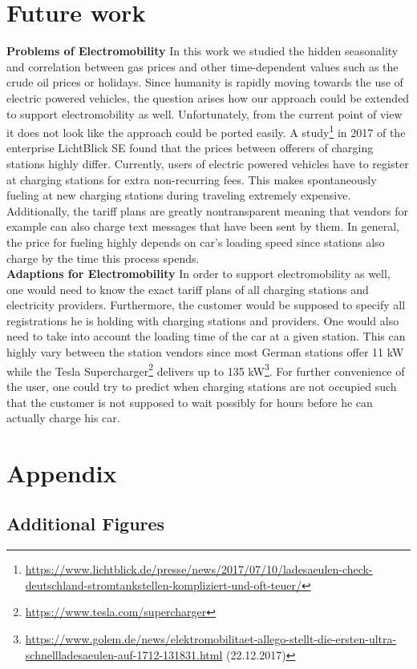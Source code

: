 \documentclass[%
a4paper,
DIV12,
2.5headlines,
bigheadings,
titlepage,
openbib,
]{scrartcl}
\begin{document}
\section{Future work}\label{future-work}
\textbf{Problems of Electromobility}
In this work we studied the hidden seasonality and correlation between gas prices and other time-dependent values such as the crude oil prices or holidays.
Since humanity is rapidly moving towards the use of electric powered vehicles, the question arises how our approach could be extended to support electromobility as well.
Unfortunately, from the current point of view it does not look like the approach could be ported easily.
A study\footnote{\url{https://www.lichtblick.de/presse/news/2017/07/10/ladesaeulen-check-deutschland-stromtankstellen-kompliziert-und-oft-teuer/}} in 2017 of the enterprise LichtBlick SE found that the prices between offerers of charging stations highly differ.
Currently, users of electric powered vehicles have to register at charging stations for extra non-recurring fees.
This makes spontaneously fueling at new charging stations during traveling extremely expensive.
Additionally, the tariff plans are greatly nontransparent meaning that vendors for example can also charge text messages that have been sent by them.
In general, the price for fueling highly depends on car's loading speed since stations also charge by the time this process spends.\\

\textbf{Adaptions for Electromobility}
In order to support electromobility as well, one would need to know the exact tariff plans of all charging stations and electricity providers.
Furthermore, the customer would be supposed to specify all registrations he is holding with charging stations and providers.
One would also need to take into account the loading time of the car at a given station.
This can highly vary between the station vendors since most German stations offer 11 kW while the Tesla Supercharger\footnote{\url{https://www.tesla.com/supercharger}} delivers up to 135 kW\footnote{\url{https://www.golem.de/news/elektromobilitaet-allego-stellt-die-ersten-ultra-schnellladesaeulen-auf-1712-131831.html} (22.12.2017)}.
For further convenience of the user, one could try to predict when charging stations are not occupied such that the customer is not supposed to wait possibly for hours before he can actually charge his car.


 
\newpage
\section{Appendix}\label{appendix}
\subsection{Additional Figures}

%
\end{document}
